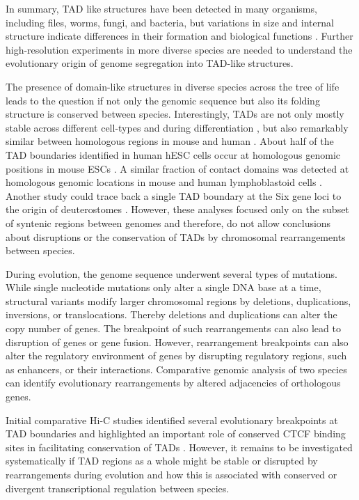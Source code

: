 \documentclass[a4paper,twoside=true,openright,parskip=full,chapterprefix=true,11pt,headings=normal,bibliography=totoc,listof=totoc,titlepage=on,captions=tableabove,draft=false]{scrreprt}
\theoremstyle{definition}
\theoremstyle{definition}
\theoremstyle{definition}
\theoremstyle{remark}
\begin{document}
In summary, TAD like structures have been detected in many organisms,
including files, worms, fungi, and bacteria, but variations in size and
internal structure indicate differences in their formation and
biological functions \citep{Dekker2015}. Further high-resolution
experiments in more diverse species are needed to understand the
evolutionary origin of genome segregation into TAD-like structures.

The presence of domain-like structures in diverse species across the
tree of life leads to the question if not only the genomic sequence but
also its folding structure is conserved between species. Interestingly,
TADs are not only mostly stable across different cell-types
\citep{Dixon2012, Rao2014} and during differentiation \citep{Dixon2015},
but also remarkably similar between homologous regions in mouse and
human \citep{Dixon2012}. About half of the TAD boundaries identified in
human hESC cells occur at homologous genomic positions in mouse ESCs
\citep{Dixon2012}. A similar fraction of contact domains was detected at
homologous genomic locations in mouse and human lymphoblastoid cells
\citep{Rao2014}. Another study could trace back a single TAD boundary at
the Six gene loci to the origin of deuterostomes
\citep{Gomez-Marin2015}. However, these analyses focused only on the
subset of syntenic regions between genomes and therefore, do not allow
conclusions about disruptions or the conservation of TADs by chromosomal
rearrangements between species.

During evolution, the genome sequence underwent several types of
mutations. While single nucleotide mutations only alter a single DNA
base at a time, structural variants modify larger chromosomal regions by
deletions, duplications, inversions, or translocations. Thereby
deletions and duplications can alter the copy number of genes. The
breakpoint of such rearrangements can also lead to disruption of genes
or gene fusion. However, rearrangement breakpoints can also alter the
regulatory environment of genes by disrupting regulatory regions, such
as enhancers, or their interactions. Comparative genomic analysis of two
species can identify evolutionary rearrangements by altered adjacencies
of orthologous genes.

Initial comparative Hi-C studies identified several evolutionary
breakpoints at TAD boundaries and highlighted an important role of
conserved CTCF binding sites in facilitating conservation of TADs
\citep{VietriRudan2015}. However, it remains to be investigated
systematically if TAD regions as a whole might be stable or disrupted by
rearrangements during evolution and how this is associated with
conserved or divergent transcriptional regulation between species.
\end{document}
